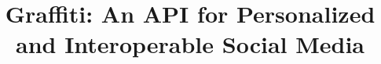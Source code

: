 \documentclass[sigconf,review,anonymous]{acmart}
\title{Graffiti: An API for Personalized and Interoperable Social Media}
\begin{document}
\begin{abstract}

\end{abstract}
\maketitle










\end{document}
